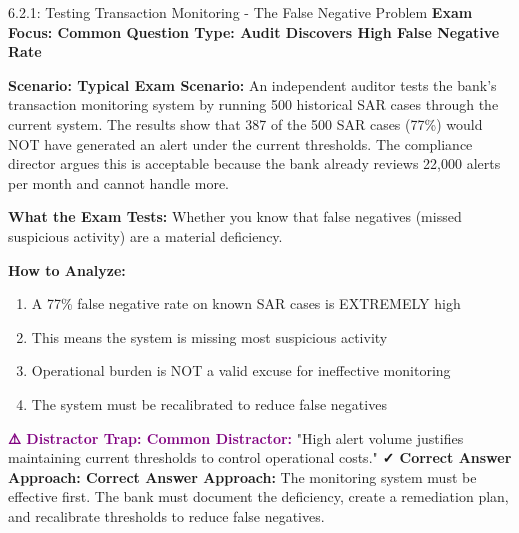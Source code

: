 \documentclass[11pt,a4paper]{beamer}
\newcommand{\examfocus}[1]{\textcolor{orange!80!black}{\textbf{Exam Focus: #1}}}
\newcommand{\trap}[1]{\textcolor{purple}{\textbf{⚠️ Distractor Trap: #1}}}
\newcommand{\correct}[1]{\textcolor{green!50!black}{\textbf{✓ Correct Answer Approach: #1}}}
\newcommand{\scenario}[1]{\textcolor{blue!70!black}{\textbf{Scenario: #1}}}
\begin{document}
	\begin{frame}{6.2.1: Testing Transaction Monitoring - The False Negative Problem}
		\examfocus{Common Question Type: Audit Discovers High False Negative Rate}
		
		\scenario{Typical Exam Scenario:}
		An independent auditor tests the bank's transaction monitoring system by running 500 historical SAR cases through the current system. The results show that 387 of the 500 SAR cases (77\%) would NOT have generated an alert under the current thresholds. The compliance director argues this is acceptable because the bank already reviews 22,000 alerts per month and cannot handle more.
		
		\textbf{What the Exam Tests:} Whether you know that false negatives (missed suspicious activity) are a material deficiency.
		
		\textbf{How to Analyze:}
		\begin{enumerate}
			\item A 77\% false negative rate on known SAR cases is EXTREMELY high
			\item This means the system is missing most suspicious activity
			\item Operational burden is NOT a valid excuse for ineffective monitoring
			\item The system must be recalibrated to reduce false negatives
		\end{enumerate}
		
		\trap{Common Distractor:} "High alert volume justifies maintaining current thresholds to control operational costs."
		\correct{Correct Answer Approach:} The monitoring system must be effective first. The bank must document the deficiency, create a remediation plan, and recalibrate thresholds to reduce false negatives.
	\end{frame}
	
\end{document}
